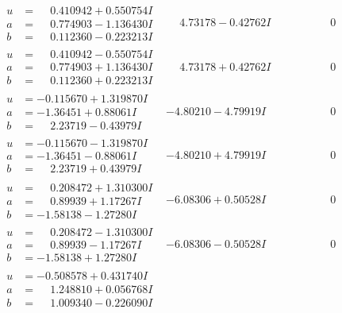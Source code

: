 \documentclass[1p]{elsarticle_modified}
\theoremstyle{definition}
\begin{document}
$$\begin{array}{c|c|c}
\begin{aligned}
u &= \phantom{-}0.410942 + 0.550754 I \\
a &= \phantom{-}0.774903 - 1.136430 I \\
b &= \phantom{-}0.112360 - 0.223213 I\end{aligned}
 & \phantom{-}4.73178 - 0.42762 I & \phantom{-0.000000 } 0 \\ \hline\begin{aligned}
u &= \phantom{-}0.410942 - 0.550754 I \\
a &= \phantom{-}0.774903 + 1.136430 I \\
b &= \phantom{-}0.112360 + 0.223213 I\end{aligned}
 & \phantom{-}4.73178 + 0.42762 I & \phantom{-0.000000 } 0 \\ \hline\begin{aligned}
u &= -0.115670 + 1.319870 I \\
a &= -1.36451 + 0.88061 I \\
b &= \phantom{-}2.23719 - 0.43979 I\end{aligned}
 & -4.80210 - 4.79919 I & \phantom{-0.000000 } 0 \\ \hline\begin{aligned}
u &= -0.115670 - 1.319870 I \\
a &= -1.36451 - 0.88061 I \\
b &= \phantom{-}2.23719 + 0.43979 I\end{aligned}
 & -4.80210 + 4.79919 I & \phantom{-0.000000 } 0 \\ \hline\begin{aligned}
u &= \phantom{-}0.208472 + 1.310300 I \\
a &= \phantom{-}0.89939 + 1.17267 I \\
b &= -1.58138 - 1.27280 I\end{aligned}
 & -6.08306 + 0.50528 I & \phantom{-0.000000 } 0 \\ \hline\begin{aligned}
u &= \phantom{-}0.208472 - 1.310300 I \\
a &= \phantom{-}0.89939 - 1.17267 I \\
b &= -1.58138 + 1.27280 I\end{aligned}
 & -6.08306 - 0.50528 I & \phantom{-0.000000 } 0 \\ \hline\begin{aligned}
u &= -0.508578 + 0.431740 I \\
a &= \phantom{-}1.248810 + 0.056768 I \\
b &= \phantom{-}1.009340 - 0.226090 I\end{aligned}

\end{array}$$
\end{document}
